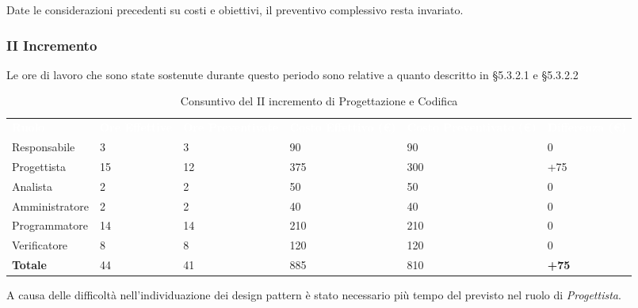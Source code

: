 Date le considerazioni precedenti su costi e obiettivi, il preventivo complessivo resta invariato.

\pagebreak


\subsubsection{II Incremento}
Le ore di lavoro che sono state sostenute durante questo periodo sono relative a quanto descritto in §5.3.2.1 e §5.3.2.2

\begin{table}[H]
\begin{center}
\renewcommand{\arraystretch}{1.5}
\begin{tabular}{ m{}<{\centering}  m{}<{\centering} m{}<{\centering} m{}<{\centering} m{}<{\centering} m{}<{\centering}}
	\rowcolor{darkblue}
	\textcolor{white}{\textbf{Ruolo}} & \textcolor{white}{\textbf{Ore Effettive}} & \textcolor{white}{\textbf{Ore Preventivate}}&\textcolor{white}{\textbf{Costo Effettivo (\euro)}}&\textcolor{white}{\textbf{Costo Preventivato (\euro)}}&\textcolor{white}{\textbf{Differenza (\euro)}}\\ 

	Responsabile  & 3 & 3 & 90 & 90 & 0\\	
	
	Progettista & 15 & 12 & 375 & 300 & +75\\
	
	Analista & 2 & 2 & 50 & 50 & 0\\
	
	Amministratore & 2 & 2 & 40 & 40 & 0\\
	
	Programmatore & 14 & 14 & 210 & 210 & 0\\
	
	Verificatore & 8 & 8 & 120 & 120 & 0\\
	
	\textbf{Totale} & 44 & 41 & 885 & 810 & \textbf{+75} \\
	
\end{tabular}
\caption{Consuntivo del II incremento di Progettazione e Codifica}
\end{center}
\end{table}

A causa delle difficoltà nell'individuazione dei design pattern è stato necessario più tempo del previsto nel ruolo di \textit{Progettista}.

